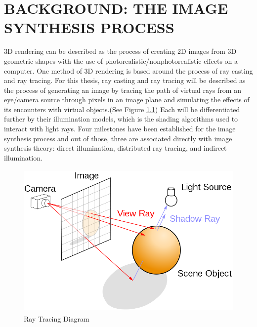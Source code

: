 %
%
%





\chapter{\uppercase {Background: The Image Synthesis Process}}
3D rendering can be described as the process of creating 2D images from 3D geometric shapes with the use of photorealistic/nonphotorealistic effects on a computer. One method of 3D rendering is based around the process of ray casting and ray tracing.  For this thesis, ray casting and ray tracing will be described as the process of generating an image by tracing the path of virtual rays from an eye/camera source through pixels in an image plane and simulating the effects of its encounters with virtual objects.(See Figure \ref{fig:raytracingdiagram})  Each will be differentiated further by their illumination models, which is the shading algorithms used to interact with light rays. Four milestones have been established for the image synthesis process and out of those, three are associated directly with image synthesis theory: direct illumination, distributed ray tracing, and indirect illumination.

\begin{figure}[h]
\centering
\includegraphics[height=3.0in]{figures/Ray_trace_diagram.png}
\caption{Ray Tracing Diagram\cite{RayTracingDiagram}}
\label{fig:raytracingdiagram}
\end{figure}

